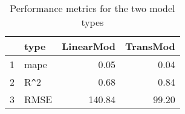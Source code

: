\begin{table}[ht]
\centering
\begin{tabular}{rlrr}
  \hline
 & type & LinearMod & TransMod \\ 
  \hline
1 & mape & 0.05 & 0.04 \\ 
  2 & R\verb|^|2 & 0.68 & 0.84 \\ 
  3 & RMSE & 140.84 & 99.20 \\ 
   \hline
\end{tabular}
\caption{Performance metrics for the two model types} 
\label{tab:modperf}
\end{table}
